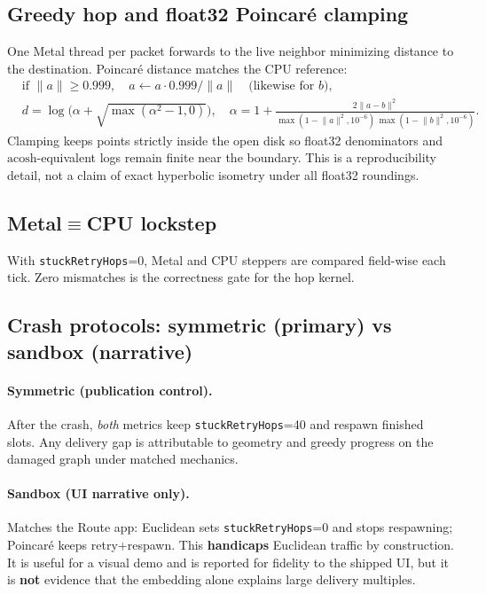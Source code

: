 \documentclass[11pt,a4paper]{article}
\begin{document}
\subsection{Greedy hop and float32 Poincar\'e clamping}
One Metal thread per packet forwards to the live neighbor minimizing
distance to the destination. Poincar\'e distance matches the CPU reference:
\begin{align}
  &\text{if }\lVert a\rVert\ge0.999,\quad a\leftarrow a\cdot0.999/\lVert a\rVert
    \quad\text{(likewise for $b$)},\\
  &d=\log\!\bigl(\alpha+\sqrt{\max(\alpha^2-1,0)}\bigr),\quad
    \alpha=1+\frac{2\lVert a-b\rVert^2}{\max(1-\lVert a\rVert^2,10^{-6})\,
    \max(1-\lVert b\rVert^2,10^{-6})}.
\end{align}
Clamping keeps points strictly inside the open disk so float32
denominators and $\mathrm{acosh}$-equivalent logs remain finite near the
boundary. This is a reproducibility detail, not a claim of exact hyperbolic
isometry under all float32 roundings.

\subsection{Metal$\equiv$CPU lockstep}
With \texttt{stuckRetryHops}=0, Metal and CPU steppers are compared field-wise
each tick. Zero mismatches is the correctness gate for the hop kernel.

\subsection{Crash protocols: symmetric (primary) vs sandbox (narrative)}
\label{sec:crash-protocols}

\paragraph{Symmetric (publication control).}
After the crash, \emph{both} metrics keep \texttt{stuckRetryHops}=40 and
respawn finished slots. Any delivery gap is attributable to geometry and
greedy progress on the damaged graph under matched mechanics.

\paragraph{Sandbox (UI narrative only).}
Matches the Route app: Euclidean sets \texttt{stuckRetryHops}=0 and stops
respawning; Poincar\'e keeps retry+respawn. This \textbf{handicaps}
Euclidean traffic by construction. It is useful for a visual demo and is
reported for fidelity to the shipped UI, but it is \textbf{not} evidence
that the embedding alone explains large delivery multiples.
\end{document}
